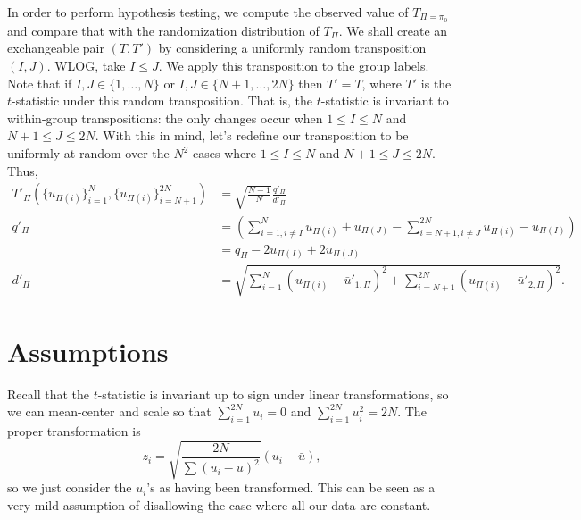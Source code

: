 In order to perform hypothesis testing, we compute the observed value of $T_{\Pi=\pi_0}$ and compare
that with the randomization distribution of $T_{\Pi}$.  We shall create an exchangeable pair $(T, T')$
by considering a uniformly random transposition $(I, J)$.  WLOG, take $I \leq J$.  We apply this
transposition to the group labels.  Note that if $I, J \in \{1,\ldots,N\}$ or $I, J \in
\{N+1,\ldots,2N\}$ then $T' = T$, where $T'$ is the $t$-statistic under this random transposition.
That is, the $t$-statistic is invariant to within-group transpositions: the only changes occur when
$1 \leq I \leq N$ and $N + 1 \leq J \leq 2N$.  With this in mind, let's redefine our transposition
to be uniformly at random over the $N^2$ cases where $1 \leq I \leq N$ and $N + 1 \leq J \leq
2N$. Thus,
\begin{align*}
  T'_{\Pi}(\{u_{\Pi(i)}\}_{i=1}^N, \{u_{\Pi(i)}\}_{i=N+1}^{2N}) 
  &= \sqrt{\frac{N-1}{N}}\frac{q'_{\Pi}}{d'_{\Pi}} \\
  q'_{\Pi} &= \left (\sum_{i=1, i\neq I}^N u_{\Pi(i)} + u_{\Pi(J)} -
    \sum_{i=N+1, i\neq J}^{2N}u_{\Pi(i)} - u_{\Pi(I)} \right ) \\
  &= q_{\Pi} - 2u_{\Pi(I)} + 2u_{\Pi(J)} \\
  d'_{\Pi} &= \sqrt{\sum_{i=1}^N(u_{\Pi(i)} - \bar{u}'_{1, \Pi})^{2} +
    \sum_{i=N+1}^{2N}(u_{\Pi(i)} - \bar{u}'_{2, \Pi})^{2}}.  
\end{align*}

\section{Assumptions}
Recall that the $t$-statistic is invariant up to sign under linear transformations, so we can
mean-center and scale so that $\sum_{i=1}^{2N} u_{i} = 0$ and $\sum_{i=1}^{2N} u_{i}^2 = 2N$.  The
proper transformation is 
\begin{equation}
  z_i = \sqrt{\frac{2N}{\sum (u_{i} - \bar{u})^2}}(u_{i}-\bar{u}), 
\end{equation}
so we just consider the $u_{i}$'s as having been transformed.  This can be seen as a very mild
assumption of disallowing the case where all our data are constant.  

